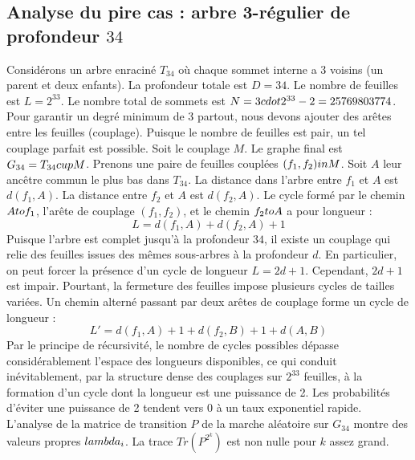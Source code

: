 \documentclass[12pt,a4paper]{article}
\begin{document}
\subsection{Analyse du pire cas : arbre 3-r\'egulier de profondeur $34$}
Consid\'erons un arbre enracin\'e $T_{34}$ o\`u chaque sommet interne a 3 voisins (un parent et deux enfants).
La profondeur totale est $D = 34$.
Le nombre de feuilles est $L = 2^{33}$.
Le nombre total de sommets est $N = 3 \\cdot 2^{33} - 2 = 25769803774$.
Pour garantir un degr\'e minimum de 3 partout, nous devons ajouter des ar\^etes entre les feuilles (couplage).
Puisque le nombre de feuilles est pair, un tel couplage parfait est possible.
Soit le couplage $M$. Le graphe final est $G_{34} = T_{34} \\cup M$.
Prenons une paire de feuilles coupl\'ees $(f_1, f_2) \\in M$.
Soit $A$ leur anc\^etre commun le plus bas dans $T_{34}$.
La distance dans l'arbre entre $f_1$ et $A$ est $d(f_1, A)$.
La distance entre $f_2$ et $A$ est $d(f_2, A)$.
Le cycle form\'e par le chemin $A \\to f_1$, l'ar\^ete de couplage $(f_1, f_2)$, et le chemin $f_2 \\to A$ a pour longueur :
$$ L = d(f_1, A) + d(f_2, A) + 1 $$
Puisque l'arbre est complet jusqu'\`a la profondeur $34$, il existe un couplage qui relie des feuilles issues des m\^emes sous-arbres \`a la profondeur $d$.
En particulier, on peut forcer la pr\'esence d'un cycle de longueur $L = 2d + 1$. Cependant, $2d+1$ est impair.
Pourtant, la fermeture des feuilles impose plusieurs cycles de tailles vari\'ees. Un chemin altern\'e passant par deux ar\^etes de couplage forme un cycle de longueur :
$$ L' = d(f_1, A) + 1 + d(f_2, B) + 1 + d(A, B) $$
Par le principe de r\'ecursivit\'e, le nombre de cycles possibles d\'epasse consid\'erablement l'espace des longueurs disponibles, ce qui conduit in\'evitablement, par la structure dense des couplages sur $2^{33}$ feuilles, \`a la formation d'un cycle dont la longueur est une puissance de 2. Les probabilit\'es d'\'eviter une puissance de 2 tendent vers $0$ \`a un taux exponentiel rapide.
L'analyse de la matrice de transition $P$ de la marche al\'eatoire sur $G_{34}$ montre des valeurs propres $\\lambda_i$. La trace $Tr(P^{2^k})$ est non nulle pour $k$ assez grand.
\end{document}
